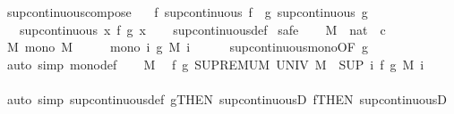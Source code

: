 \begin{isabellebody}
\isanewline
{}\isamarkupfalse%
\ sup{\isacharunderscore}continuous{\isacharunderscore}compose{\isacharcolon}\isanewline
\ \ \ f{\isacharcolon}\ {\isachardoublequoteopen}sup{\isacharunderscore}continuous\ f{\isachardoublequoteclose}\ \ g{\isacharcolon}\ {\isachardoublequoteopen}sup{\isacharunderscore}continuous\ g{\isachardoublequoteclose}\isanewline
\ \ \ {\isachardoublequoteopen}sup{\isacharunderscore}continuous\ {\isacharparenleft}{\isasymlambda}x{\isachardot}\ f\ {\isacharparenleft}g\ x{\isacharparenright}{\isacharparenright}{\isachardoublequoteclose}\isanewline
%
\isadelimproof
\ \ %
\endisadelimproof
%
\isatagproof
{}\isamarkupfalse%
\ sup{\isacharunderscore}continuous{\isacharunderscore}def\isanewline
{}\isamarkupfalse%
\ safe\isanewline
\ \ \isamarkupfalse%
\ M\ {\isacharcolon}{\isacharcolon}\ {\isachardoublequoteopen}nat\ {\isasymRightarrow}\ {\isacharprime}c{\isachardoublequoteclose}\isanewline
\ \ \isamarkupfalse%
\ M{\isacharcolon}\ {\isachardoublequoteopen}mono\ M{\isachardoublequoteclose}\isanewline
\ \ \isamarkupfalse%
\ \isamarkupfalse%
\ {\isachardoublequoteopen}mono\ {\isacharparenleft}{\isasymlambda}i{\isachardot}\ g\ {\isacharparenleft}M\ i{\isacharparenright}{\isacharparenright}{\isachardoublequoteclose}\isanewline
\ \ \ \ \isamarkupfalse%
\ sup{\isacharunderscore}continuous{\isacharunderscore}mono{\isacharbrackleft}OF\ g{\isacharbrackright}\ \isamarkupfalse%
\ {\isacharparenleft}auto\ simp{\isacharcolon}\ mono{\isacharunderscore}def{\isacharparenright}\isanewline
\ \ \isamarkupfalse%
\ M\ \isamarkupfalse%
\ {\isachardoublequoteopen}f\ {\isacharparenleft}g\ {\isacharparenleft}SUPREMUM\ UNIV\ M{\isacharparenright}{\isacharparenright}\ {\isacharequal}\ {\isacharparenleft}SUP\ i{\isachardot}\ f\ {\isacharparenleft}g\ {\isacharparenleft}M\ i{\isacharparenright}{\isacharparenright}{\isacharparenright}{\isachardoublequoteclose}\isanewline
\ \ \ \ \isamarkupfalse%
\ {\isacharparenleft}auto\ simp{\isacharcolon}\ sup{\isacharunderscore}continuous{\isacharunderscore}def\ g{\isacharbrackleft}THEN\ sup{\isacharunderscore}continuousD{\isacharbrackright}\ f{\isacharbrackleft}THEN\ sup{\isacharunderscore}continuousD{\isacharbrackright}{\isacharparenright}\isanewline
{}\isamarkupfalse%
%
\endisatagproof
{\isafoldproof}%
%
\isadelimproof
\isanewline
%
\endisadelimproof
\isanewline
{}\isamarkupfalse%

\end{isabellebody}
